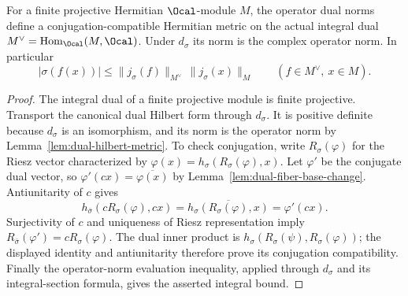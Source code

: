 \begin{lemma}
\label{lem:arithmetic-dual-metric}
\leanok
{}
For a finite projective Hermitian $\Ocal$-module $M$, the operator dual
norms define a conjugation-compatible Hermitian metric on the actual
integral dual $M^\vee=\operatorname{Hom}_\Ocal(M,\Ocal)$. Under
$d_\sigma$ its norm is the complex operator norm. In particular
\[
 |\sigma(f(x))|\leq\|j_\sigma(f)\|_{M^\vee}\,
                         \|j_\sigma(x)\|_M
 \qquad(f\in M^\vee,\ x\in M).
\]
\end{lemma}
\begin{proof}
The integral dual of a finite projective module is finite projective.
Transport the canonical dual Hilbert form through $d_\sigma$.
It is positive definite because $d_\sigma$ is an isomorphism, and its
norm is the operator norm by Lemma~\ref{lem:dual-hilbert-metric}.
To check conjugation, write $R_\sigma(\varphi)$ for the Riesz vector
characterized by $\varphi(x)=h_\sigma(R_\sigma(\varphi),x)$.
Let $\varphi'$ be the conjugate dual vector, so
$\varphi'(cx)=\overline{\varphi(x)}$ by
Lemma~\ref{lem:dual-fiber-base-change}. Antiunitarity of $c$ gives
\[
 h_{\bar\sigma}(cR_\sigma(\varphi),cx)
  =\overline{h_\sigma(R_\sigma(\varphi),x)}=\varphi'(cx).
\]
Surjectivity of $c$ and uniqueness of Riesz representation imply
$R_{\bar\sigma}(\varphi')=cR_\sigma(\varphi)$.
The dual inner product is $h_\sigma(R_\sigma(\psi),R_\sigma(\varphi))$;
the displayed identity and antiunitarity therefore prove its conjugation
compatibility. Finally the operator-norm evaluation inequality, applied
through $d_\sigma$ and its integral-section formula, gives the asserted
integral bound.
\end{proof}

